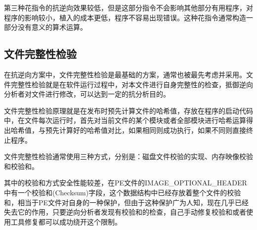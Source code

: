 第三种花指令的抗逆向效果较低，但是这部分指令不会影响其他部分有用程序，对程序的影响较小，植入的成本更低，程序不容易出现错误。这种花指令通常构造一部分没有意义的算术运算。


\subsection{文件完整性检验}

在抗逆向方案中，文件完整性检验是最基础的方案，通常也被最先考虑并采用。文件完整性检验就是在软件运行过程中，对本文件进行自身完整性的检查，抵御逆向分析者对文件进行修改，可以达到一定的抗分析目的。

文件完整性检验原理就是在发布时预先计算文件的哈希值，存放在程序的启动代码中，在文件每次运行时，首先对当前文件的某个模块或者全部模块进行哈希运算得出哈希值，与预先计算好的哈希值对比，如果相同则成功执行，如果不同则直接终止程序。

文件完整性检验通常使用三种方式，分别是：磁盘文件校验的实现、内存映像校验和校验和。

其中的校验和方式安全性能较差，在PE文件的IMAGE\_OPTIONAL\_HEADER中有一个校验和(Checksum)字段，这个数据结构中已经存放着整个文件的校验和，相当于PE文件对自身的一种保护，但由于这种保护广为人知，现在几乎已经失去它的作用，只要逆向分析者发现有校验和的检查，自己手动修复校验和或者使用工具修复都可以成功绕开这个限制。







